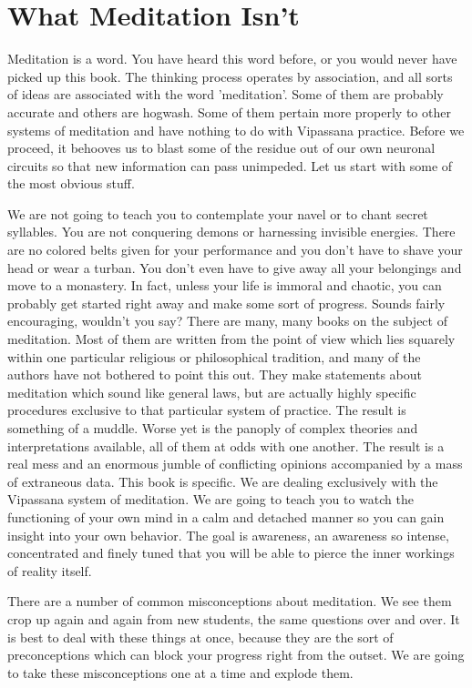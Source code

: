 \chapter{ What Meditation Isn't}

Meditation is a word. You have heard this word before, or you would never have
picked up this book. The thinking process operates by association, and all sorts
of ideas are associated with the word 'meditation'. Some of them are probably
accurate and others are hogwash. Some of them pertain more properly to other
systems of meditation and have nothing to do with Vipassana practice. Before we
proceed, it behooves us to blast some of the residue out of our own neuronal
circuits so that new information can pass unimpeded. Let us start with some of
the most obvious stuff.

We are not going to teach you to contemplate your navel or to chant secret
syllables. You are not conquering demons or harnessing invisible energies. There
are no colored belts given for your performance and you don't have to shave your
head or wear a turban. You don't even have to give away all your belongings and
move to a monastery. In fact, unless your life is immoral and chaotic, you can
probably get started right away and make some sort of progress. Sounds fairly
encouraging, wouldn't you say?  There are many, many books on the subject of
meditation. Most of them are written from the point of view which lies squarely
within one particular religious or philosophical tradition, and many of the
authors have not bothered to point this out. They make statements about
meditation which sound like general laws, but are actually highly specific
procedures exclusive to that particular system of practice. The result is
something of a muddle. Worse yet is the panoply of complex theories and
interpretations available, all of them at odds with one another. The result is a
real mess and an enormous jumble of conflicting opinions accompanied by a mass
of extraneous data. This book is specific. We are dealing exclusively with the
Vipassana system of meditation. We are going to teach you to watch the
functioning of your own mind in a calm and detached manner so you can gain
insight into your own behavior. The goal is awareness, an awareness so intense,
concentrated and finely tuned that you will be able to pierce the inner workings
of reality itself.

There are a number of common misconceptions about meditation. We see them crop
up again and again from new students, the same questions over and over. It is
best to deal with these things at once, because they are the sort of
preconceptions which can block your progress right from the outset. We are going
to take these misconceptions one at a time and explode them.

